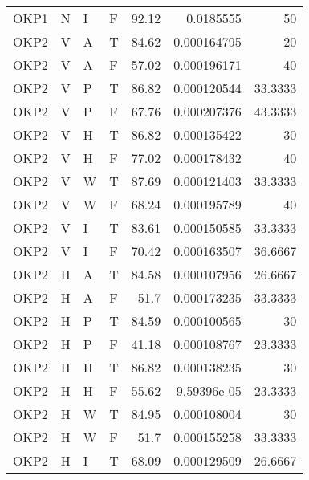 \begin{longtable}{llllrrr}
    OKP1     & N         & I         & F          & 92.12      & 0.0185555   & 50       \\
    OKP2     & V         & A         & T          & 84.62      & 0.000164795 & 20       \\
    OKP2     & V         & A         & F          & 57.02      & 0.000196171 & 40       \\
    OKP2     & V         & P         & T          & 86.82      & 0.000120544 & 33.3333  \\
    OKP2     & V         & P         & F          & 67.76      & 0.000207376 & 43.3333  \\
    OKP2     & V         & H         & T          & 86.82      & 0.000135422 & 30       \\
    OKP2     & V         & H         & F          & 77.02      & 0.000178432 & 40       \\
    OKP2     & V         & W         & T          & 87.69      & 0.000121403 & 33.3333  \\
    OKP2     & V         & W         & F          & 68.24      & 0.000195789 & 40       \\
    OKP2     & V         & I         & T          & 83.61      & 0.000150585 & 33.3333  \\
    OKP2     & V         & I         & F          & 70.42      & 0.000163507 & 36.6667  \\
    OKP2     & H         & A         & T          & 84.58      & 0.000107956 & 26.6667  \\
    OKP2     & H         & A         & F          & 51.7       & 0.000173235 & 33.3333  \\
    OKP2     & H         & P         & T          & 84.59      & 0.000100565 & 30       \\
    OKP2     & H         & P         & F          & 41.18      & 0.000108767 & 23.3333  \\
    OKP2     & H         & H         & T          & 86.82      & 0.000138235 & 30       \\
    OKP2     & H         & H         & F          & 55.62      & 9.59396e-05 & 23.3333  \\
    OKP2     & H         & W         & T          & 84.95      & 0.000108004 & 30       \\
    OKP2     & H         & W         & F          & 51.7       & 0.000155258 & 33.3333  \\
    OKP2     & H         & I         & T          & 68.09      & 0.000129509 & 26.6667  \\

\end{longtable}

